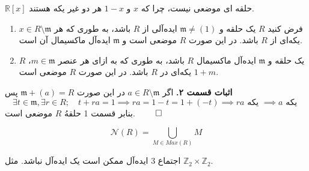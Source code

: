 \begin{frame}
    \begin{corollary}
        \(\mathbb{R}[x]\)
        حلقه ای موضعی نیست،‌ چرا که
        \(x\)
        و
        \(1-x\)
        هر دو غیر یکه هستند.
    \end{corollary}

    \begin{corollary}
        \begin{enumerate}
            \item فرض کنید
                  \(R\)
                  یک حلقه و
                  \(\mathfrak{m}  \neq (1)\)
                  ایده‌آلی از
                  \(R\)
                  باشد، به طوری که هر
                  \(x \in R \setminus \mathfrak{m}\)
                  یکه‌ای از
                  \(R\)
                  باشد. در این صورت
                  \(R\)
                  موضعی است و
                  \(\mathfrak{m}\)
                  ایده‌آل ماکسیمال آن است.
                  \label{part1}
            \item \(R\)
                  یک حلقه و
                  \(\mathfrak{m}\)
                  ایده‌آل ماکسیمال
                  \(R\)
                  باشد، به طوری که به ازای هر عنصر
                  \(m \in \mathfrak{m}\)،
                  \(1+m\)
                  یکه‌ای در
                  \(R\)
                  باشد. در این صورت
                  \(R\)
                  موضعی است.
                  \label{part2}
        \end{enumerate}
    \end{corollary}


    \textbf{اثبات قسمت ۲.}
    اگر
    \(a \in R \setminus \mathfrak{m}\)
    در این صورت
    \(\mathfrak{m} + (a) = R\)
    پس
    \[
        \exists t \in \mathfrak{m}, \exists r \in R; \quad t + ra = 1 \implies ra = 1 - t = 1 + (-t) \implies ra \text{ یکه } \implies a \text{ یکه }
    \]
    بنابر
    قسمت
    1
    حلقهُ
    \(R\)
    موضعی است.
    \hfill \(\qed\)
\end{frame}

\begin{frame}
    \begin{definition}
        \[
            \mathcal{N}(R) = \bigcup_{M \in Max(R)} M
        \]
    \end{definition}


    \begin{remark}
        اجتماع 3 ایده‌آل ممکن است یک ایده‌آل نباشد. مثل \( \mathbb{Z}_2 \times \mathbb{Z}_2 \).
    \end{remark}

\end{frame}

